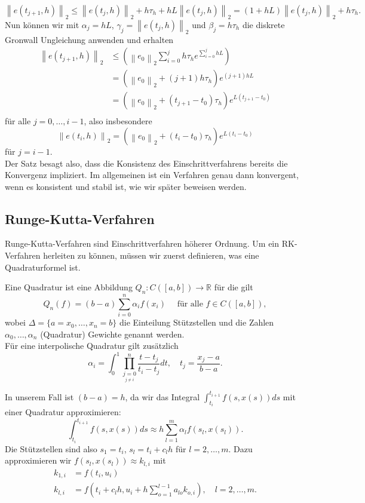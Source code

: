 \[
    \left\lVert e(t_{j+1},h) \right\rVert_2 \leq \left\lVert e(t_j, h) \right\rVert_2 + h\tau_h
    + hL\left\lVert e(t_j,h) \right\rVert_2 = (1 + hL) \left\lVert e(t_j,h) \right\rVert_2 + h\tau_h.
\]
Nun können wir mit $\alpha_j=hL$, $\gamma_j =\left\lVert e(t_j,h) \right\rVert_2$ und $\beta_j = h\tau_h$ die diskrete
Gronwall Ungleichung anwenden und erhalten
\begin{align*}
    \left\lVert e(t_{j+1},h) \right\rVert_2
    &\leq \left( \left\lVert e_0 \right\rVert_2 \sum_{i=0}^{j} h\tau_h e^{\sum_{i=0}^{j} hL } \right)\\
    &= \left( \left\lVert e_0 \right\rVert_2 + (j+1)h \tau_h \right)e^{(j+1)hL} \\
    &= \left( \left\lVert e_0 \right\rVert_2 + (t_{j+1} - t_0) \tau_h \right)e^{L(t_{j+1} - t_0)} \\
\end{align*}
für alle $j=0, \dots, i-1$, also insbesondere
\[
    \left\lVert e(t_{i},h) \right\rVert_2
    = \left( \left\lVert e_0 \right\rVert_2 + (t_{i} - t_0) \tau_h \right)e^{L(t_{i} - t_0)}
\]
für $j=i-1$.\qedwhite\\
Der Satz besagt also, dass die Konsistenz des Einschrittverfahrens bereits die Konvergenz impliziert. Im allgemeinen ist
ein Verfahren genau dann konvergent, wenn es konsistent und stabil ist, wie wir später beweisen werden.

\subsection{Runge-Kutta-Verfahren}
Runge-Kutta-Verfahren sind Einschrittverfahren höherer Ordnung. Um ein RK-Verfahren herleiten zu können, müssen wir
zuerst definieren, was eine Quadraturformel ist.
\begin{definition}
    Eine Quadratur ist eine Abbildung $Q_n: C([a,b])\rightarrow \mathbb{R}$ für die gilt
    \[
        Q_n(f) = (b-a)\sum_{i=0}^{n}\alpha_i f(x_i) \quad \text{ für alle } f\in C([a,b]),
    \]
    wobei $\Delta = \{a=x_0, \dots, x_n=b\}$ die Einteilung Stützstellen und die Zahlen $\alpha_0, \dots, \alpha_n$
    (Quadratur) Gewichte genannt werden.\\
    Für eine interpolische Quadratur gilt zusätzlich
    \[
        \alpha_i = \int_{0}^{1} \prod_{\underset{j\neq i}{j=0}}^{n} \frac{t-t_j}{t_i-t_j} dt,
        \quad t_j = \frac{x_j-a}{b-a}.
    \]
\end{definition}
In unserem Fall ist $(b-a)=h$, da wir das Integral $\int_{t_i}^{t_{i+1}} f(s,x(s))ds$ mit einer Quadratur approximieren:
\[
    \int_{t_i}^{t_{i+1}} f(s,x(s))ds \approx h \sum_{l=1}^{m}\alpha_l f(s_l,x(s_l)).
\]
Die Stützstellen sind also $s_1=t_i$, $s_l=t_i+c_{l} h$ für $l = 2,\dots, m$. Dazu approximieren wir
$f(s_l,x(s_l))\approx k_{l,i}$ mit
\begin{align}
    k_{1,i} &= f(t_i,u_i) \nonumber \\
    k_{l,i} &= f(t_i+c_lh, u_i + h\sum_{o=1}^{l-1}a_{lo}k_{o,i} ), \quad l=2,\dots,m.   \label{eq:rk}
\end{align}

